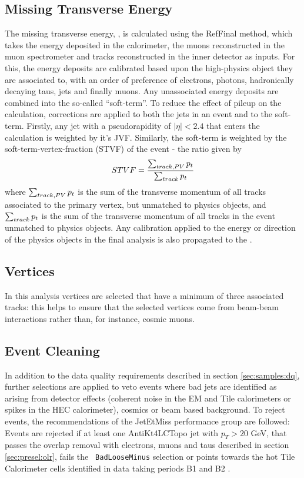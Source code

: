 \subsection{Missing Transverse Energy}
\label{sec:presel:met}

The missing transverse energy, \MET, is calculated using the
RefFinal method, which takes the energy
deposited in the calorimeter, the muons reconstructed in the muon
spectrometer and tracks reconstructed in the inner detector as inputs. 
For this, the energy deposits are calibrated based
upon the high-\pt physics object they are associated to, with an order
of preference of electrons, photons, hadronically decaying taus, jets
and finally muons. Any unassociated energy deposits are combined into
the so-called ``soft-term''. To reduce the effect of pileup on the
\met calculation, corrections are applied to both the jets in an event
and to the soft-term. Firstly, any jet with a pseudorapidity of $|\eta|<2.4$
that enters the \met calculation is weighted by it's JVF. Similarly,
the soft-term is weighted by the soft-term-vertex-fraction (STVF) of
the event - the ratio given by
\begin{equation}
STVF = \frac{\sum_{track, PV}p_{t}}{\sum_{track}p_{t}}
\end{equation}
where $\sum_{track, PV}p_{t}$ is the sum of the transverse momentum of
all tracks associated to the primary vertex, but unmatched to physics
objects, and $\sum_{track}p_{t}$ is the sum of
the transverse momentum of all tracks in the event unmatched to
physics objects. Any calibration applied
to the energy or direction of the physics objects in the final
analysis is also propagated to the \met.


\subsection{Vertices} 
\label{sec:presel:vertices}
In this analysis vertices are selected that have a minimum of three
associated tracks: this helps to ensure that the selected vertices
come from beam-beam interactions rather than, for instance, cosmic
muons.

\subsection{Event Cleaning}
\label{sec:presel:celaning}

In addition to the data quality requirements described in section
\ref{sec:samples:dq}, further selections are applied to veto events
where bad jets are identified as arising from detector effects
(coherent noise in the EM and Tile calorimeters or spikes in the HEC
calorimeter), cosmics or beam based background. To reject events, the
recommendations of the JetEtMiss performance group \cite{jetMETreco}
are followed: Events are rejected if at least one AntiKt4LCTopo jet
with $p_{T}>20$ GeV, that passes the overlap removal with electrons,
muons and taus described in section \ref{sec:presel:olr}, fails the {\tt
BadLooseMinus} selection or points towards the hot Tile Calorimeter
cells identified in data taking periods B1 and B2 \cite{hottile}.



